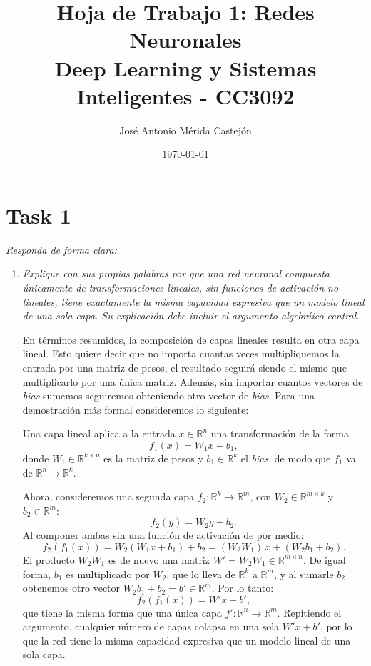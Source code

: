 \documentclass[11pt]{article}
\title{\textbf{Hoja de Trabajo 1: Redes Neuronales} \vspace{1em}\\
  Deep Learning y Sistemas Inteligentes - CC3092}
\author{José Antonio Mérida Castejón}
\date{\today}
\begin{document}
\maketitle

\section*{Task 1}
\textit{Responda de forma clara:}

\begin{enumerate}[label=\alph*.]

  \item \textit{Explique con sus propias palabras por que una red neuronal compuesta únicamente de transformaciones lineales, sin funciones de
    activación no lineales, tiene exactamente la misma capacidad expresiva que un modelo lineal de una sola capa. Su explicación debe incluir
    el argumento algebráico central.}

  En términos resumidos, la composición de capas lineales resulta en otra capa lineal. Esto quiere decir que no importa cuantas veces multipliquemos
  la entrada por una matriz de pesos, el resultado seguirá siendo el mismo que multiplicarlo por una única matriz. Además, sin importar cuantos vectores
  de \textit{bias} sumemos seguiremos obteniendo otro vector de \textit{bias}. Para una demostración más formal consideremos lo siguiente:

  Una capa lineal aplica a la entrada $x \in \mathbb{R}^n$ una transformación de la forma
  \[
    f_1(x) = W_1 x + b_1,
  \]
  donde $W_1 \in \mathbb{R}^{k \times n}$ es la matriz de pesos y $b_1 \in \mathbb{R}^k$ el \textit{bias}, de modo que $f_1$ va de $\mathbb{R}^n \to \mathbb{R}^k$.

  Ahora, consideremos una segunda capa $f_2: \mathbb{R}^k \to \mathbb{R}^m$, con $W_2 \in \mathbb{R}^{m \times k}$ y $b_2 \in \mathbb{R}^m$:
  \[
    f_2(y) = W_2 y + b_2.
  \]
  Al componer ambas sin una función de activación de por medio:
  \[
    f_2(f_1(x)) = W_2 (W_1 x + b_1) + b_2 = (W_2 W_1)\, x + (W_2 b_1 + b_2).
  \]
  El producto $W_2 W_1$ es de nuevo una matriz $W' = W_2 W_1 \in \mathbb{R}^{m \times n}$. De igual forma, $b_1$ es multiplicado por $W_2$,
  que lo lleva de $\mathbb{R}^k$ a $\mathbb{R}^m$, y al sumarle $b_2$ obtenemos otro vector $W_2 b_1 + b_2 = b' \in \mathbb{R}^m$. Por lo tanto:
  \[
    f_2(f_1(x)) = W' x + b',
  \]
  que tiene la misma forma que una única capa $f': \mathbb{R}^n \to \mathbb{R}^m$. Repitiendo el argumento, cualquier número de capas colapsa en una sola $W'x + b'$, por lo que la red tiene la misma capacidad expresiva que un modelo lineal de una sola capa.


\end{enumerate}
\end{document}
